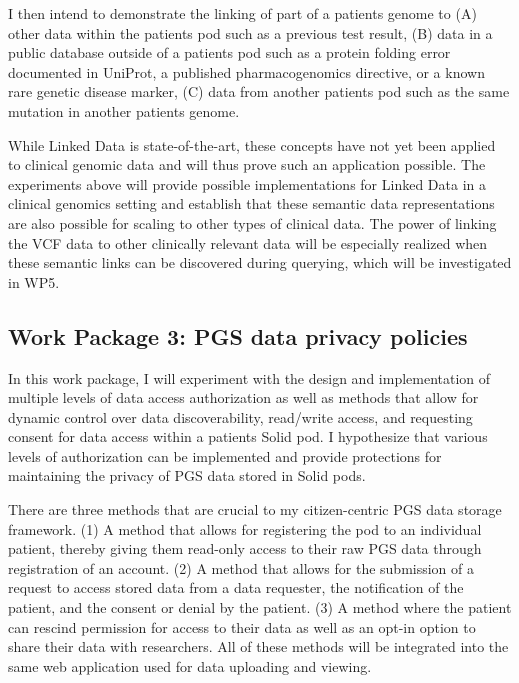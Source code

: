 \documentclass[runningheads]{llncs}
\begin{document}
I then intend to demonstrate the linking of part of a patient\textquotesingle s genome to
(A) other data within the patient\textquotesingle s pod such as a previous test result, 
(B) data in a public database outside of a patient\textquotesingle s pod such as a protein folding error documented in UniProt, a published pharmacogenomics directive, or a known rare genetic disease marker,
(C) data from another patient\textquotesingle s pod such as the same mutation in another patient\textquotesingle s genome.

While Linked Data is state-of-the-art, these concepts have not yet been applied to clinical genomic data and will thus prove such an application possible. 
The experiments above will provide possible implementations for Linked Data in a clinical genomics setting and establish that these semantic data representations are also possible for scaling to other types of clinical data.
The power of linking the VCF data to other clinically relevant data will be especially realized when these semantic links can be discovered during querying, which will be investigated in WP5. 


\subsection{Work Package 3: PGS data privacy policies}

In this work package, I will experiment with the design and implementation of multiple levels of data access authorization as well as methods that allow for dynamic control over data discoverability, read/write access, and requesting consent for data access within a patient\textquotesingle s Solid pod. 
I hypothesize that various levels of authorization can be implemented and provide protections for maintaining the privacy of PGS data stored in Solid pods.

There are three methods that are crucial to my citizen-centric PGS data storage framework.
(1) A method that allows for registering the pod to an individual patient, thereby giving them read-only access to their raw PGS data through registration of an account.
(2) A method that allows for the submission of a request to access stored data from a data requester, the notification of the patient, and the consent or denial by the patient.
(3) A method where the patient can rescind permission for access to their data as well as an opt-in option to share their data with researchers. 
All of these methods will be integrated into the same web application used for data uploading and viewing.
\end{document}

